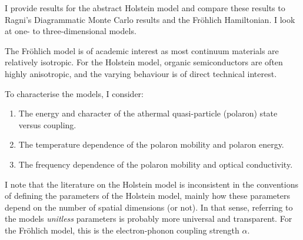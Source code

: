 
I provide results for the abstract Holstein model and compare these results to Ragni's Diagrammatic Monte Carlo results and the Fr\"ohlich Hamiltonian. I look at one- to three-dimensional models. 

The Fr\"ohlich model is of academic interest as most continuum materials are relatively isotropic. For the Holstein model, organic semiconductors are often highly anisotropic, and the varying behaviour is of direct technical interest. 

To characterise the models, I consider:
\begin{enumerate}
    \item The energy and character of the athermal quasi-particle (polaron) state versus coupling.
    \item The temperature dependence of the polaron mobility and polaron energy.
    \item The frequency dependence of the polaron mobility and optical conductivity. 
\end{enumerate}
I note that the literature on the Holstein model is inconsistent in the conventions of defining the parameters of the Holstein model, mainly how these parameters depend on the number of spatial dimensions (or not). In that sense, referring to the models \emph{unitless} parameters is probably more universal and transparent. For the Fr\"ohlich model, this is the electron-phonon coupling strength $\alpha$. 

